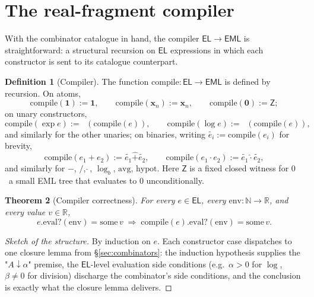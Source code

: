 \documentclass[11pt]{article}
\newcommand{\hexp}{\mathop{\widehat{\exp}}}
\newcommand{\hlog}{\mathop{\widehat{\log}}}
\newcommand{\hadd}{\mathbin{\widehat{+}}}
\newcommand{\hmul}{\mathbin{\widehat{\cdot}}}
\newcommand{\EL}{\mathsf{EL}}
\newcommand{\EML}{\mathsf{EML}}
\theoremstyle{plain}
\newtheorem{theorem}{Theorem}
\theoremstyle{definition}
\newtheorem{definition}[theorem]{Definition}
\begin{document}
\section{The real-fragment compiler}
\label{sec:real-compiler}

With the combinator catalogue in hand, the compiler $\EL \to \EML$ is
straightforward: a structural recursion on $\EL$ expressions in which
each constructor is sent to its catalogue counterpart.

\begin{definition}[Compiler]
\label{def:compile}
The function $\mathrm{compile} : \EL \to \EML$ is defined by recursion.
On atoms,
\[
  \mathrm{compile}(\mathbf{1}) := \mathbf{1}, \qquad
  \mathrm{compile}(\mathbf{x}_n) := \mathbf{x}_n, \qquad
  \mathrm{compile}(\mathbf{0}) := \mathsf{Z};
\]
on unary constructors,
\[
  \mathrm{compile}(\exp e) := \hexp(\mathrm{compile}(e)), \qquad
  \mathrm{compile}(\log e) := \hlog(\mathrm{compile}(e)),
\]
and similarly for the other unaries; on binaries, writing
$\widetilde{e_i} := \mathrm{compile}(e_i)$ for brevity,
\[
  \mathrm{compile}(e_1 + e_2) := \widetilde{e_1} \hadd \widetilde{e_2},
  \qquad
  \mathrm{compile}(e_1 \cdot e_2) := \widetilde{e_1} \hmul \widetilde{e_2},
\]
and similarly for $-$, $/$, $\hat{}\,$, $\log_b$, $\mathrm{avg}$,
$\mathrm{hypot}$. Here $\mathsf{Z}$ is a fixed closed witness for $0$
\textemdash\ a small EML tree that evaluates to $0$ unconditionally.
\end{definition}

\begin{theorem}[Compiler correctness]
\label{thm:compile}
For every $e \in \EL$, every $\mathrm{env}:\mathbb{N}\to\mathbb{R}$,
and every value $v \in \mathbb{R}$,
\[
  e.\mathrm{eval?}(\mathrm{env}) = \mathrm{some}\,v
  \;\Longrightarrow\;
  \mathrm{compile}(e).\mathrm{eval?}(\mathrm{env}) = \mathrm{some}\,v.
\]
\end{theorem}

\begin{proof}[Sketch of the structure]
By induction on $e$. Each constructor case dispatches to one closure
lemma from \S\ref{sec:combinators}: the induction hypothesis supplies
the "$A\downarrow\alpha$" premise, the $\EL$-level evaluation side
conditions (e.g.\ $\alpha > 0$ for $\log$, $\beta \ne 0$ for division)
discharge the combinator's side conditions, and the conclusion is
exactly what the closure lemma delivers.
\end{proof}
\end{document}

